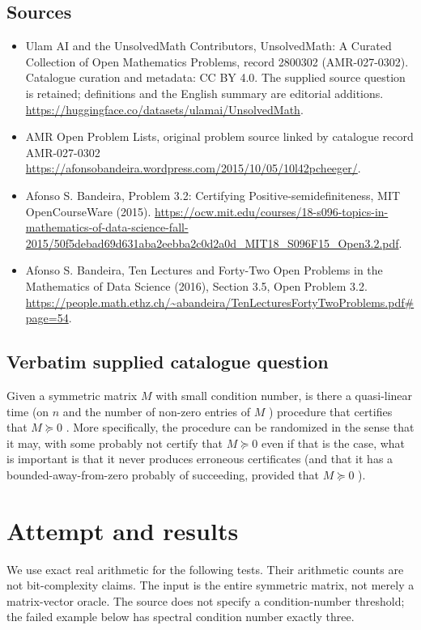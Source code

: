 \documentclass[11pt]{article}
\begin{document}
\subsection{Sources}
\begin{itemize}
\item[S1] Ulam AI and the UnsolvedMath Contributors, UnsolvedMath: A Curated Collection of Open Mathematics Problems, record 2800302 (AMR-027-0302). Catalogue curation and metadata: CC BY 4.0. The supplied source question is retained; definitions and the English summary are editorial additions.
\url{https://huggingface.co/datasets/ulamai/UnsolvedMath}.
\item[S2] AMR Open Problem Lists, original problem source linked by catalogue record AMR-027-0302
\url{https://afonsobandeira.wordpress.com/2015/10/05/10l42pcheeger/}.
\item[S3] Afonso S. Bandeira, Problem 3.2: Certifying Positive-semidefiniteness, MIT OpenCourseWare (2015).
\url{https://ocw.mit.edu/courses/18-s096-topics-in-mathematics-of-data-science-fall-2015/50f5debad69d631aba2eebba2c0d2a0d_MIT18_S096F15_Open3.2.pdf}.
\item[S4] Afonso S. Bandeira, Ten Lectures and Forty-Two Open Problems in the Mathematics of Data Science (2016), Section 3.5, Open Problem 3.2.
\url{https://people.math.ethz.ch/~abandeira/TenLecturesFortyTwoProblems.pdf#page=54}.
\end{itemize}
\subsection{Verbatim supplied catalogue question}
Given a symmetric matrix ${M}$ with small condition number, is there a quasi-linear time (on ${n}$ and the number of non-zero entries of ${M}$ ) procedure that certifies that ${M\succeq 0}$ . More specifically, the procedure can be randomized in the sense that it may, with some probably not certify that ${M\succeq 0}$ even if that is the case, what is important is that it never produces erroneous certificates (and that it has a bounded-away-from-zero probably of succeeding, provided that ${M\succeq 0}$ ).

\section{Attempt and results}
We use exact real arithmetic for the following tests. Their arithmetic counts are
not bit-complexity claims. The input is the entire symmetric matrix, not merely
a matrix-vector oracle. The source does not specify a condition-number threshold;
the failed example below has spectral condition number exactly three.
\end{document}
